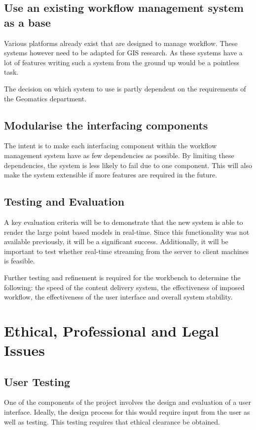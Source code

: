 \documentclass[12pt,a4paper]{article}
\begin{document}
\subsection{Use an existing workflow management system as a base}
Various platforms already exist that are designed to manage workflow. These
systems however need to be adapted for GIS research. As these systems have a lot of
features writing such a system from the ground up would be a pointless task.

The decision on which system to use is partly dependent on the requirements
of the Geomatics department.
\subsection{Modularise the interfacing components}
The intent is to make each interfacing component within the workflow management system
have as few dependencies as possible. By limiting these dependencies,
the system is less likely to fail due to one component. This will also make
the system extensible if more features are required in the future.

\subsection{Testing and Evaluation}
A key evaluation criteria will be to demonstrate that the new
system is able to render the large point based models in real-time. Since this
functionality was not available previously, it will be a significant success.
Additionally, it will be important to test whether real-time streaming from the
server to client machines is feasible.

Further testing and refinement is required for the workbench
to determine the  following: the speed of the content
delivery system, the effectiveness of imposed workflow, the
effectiveness of the user interface and overall system stability.

\section{Ethical, Professional and Legal Issues}
\subsection{User Testing}
One of the components of the project involves the design and evaluation
of a user interface. Ideally, the design process for this would require
input from the user as well as testing. This testing requires that ethical clearance
be obtained.
\end{document}
